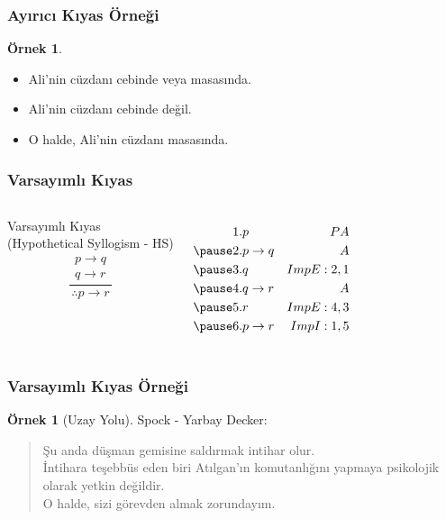 \documentclass[dvipsnames]{beamer}
\theoremstyle{definition}
\theoremstyle{example}
\newtheorem{ornek}[theorem]{Örnek}
\theoremstyle{plain}
\begin{document}
\begin{frame}
  \frametitle{Ayırıcı Kıyas Örneği}

  \begin{ornek}
    \begin{itemize}
      \item Ali'nin cüzdanı cebinde veya masasında.
      \item Ali'nin cüzdanı cebinde değil.

      \pause
      \medskip
      \item O halde, Ali'nin cüzdanı masasında.
    \end{itemize}
  \end{ornek}
\end{frame}

\begin{frame}
  \frametitle{Varsayımlı Kıyas}

  \begin{columns}
    \begin{block}{Varsayımlı Kıyas\\
      (Hypothetical Syllogism - HS)}
      \[
      \frac
        {
          \begin{array}{c}
            p \rightarrow q\\
            q \rightarrow r
          \end{array}}
        {
          \therefore p \rightarrow r
        }
      \]
    \end{block}

    \pause
    \begin{eqnarray*}
      1. & p               & PA\\
      \pause
      2. & p \rightarrow q & A\\
      \pause
      3. & q               & ImpE:2,1\\
      \pause
      4. & q \rightarrow r & A\\
      \pause
      5. & r               & ImpE:4,3\\
      \pause
      6. & p \rightarrow r & ImpI:1,5\\
    \end{eqnarray*}
  \end{columns}
\end{frame}

\begin{frame}
  \frametitle{Varsayımlı Kıyas Örneği}

  \begin{ornek}[Uzay Yolu]
    Spock - Yarbay Decker:
    \begin{quote}
      Şu anda düşman gemisine saldırmak intihar olur.\\
      İntihara teşebbüs eden biri Atılgan'ın komutanlığını yapmaya psikolojik
      olarak yetkin değildir.\\
      O halde, sizi görevden almak zorundayım.
    \end{quote}
  \end{ornek}
\end{frame}
\end{document}
